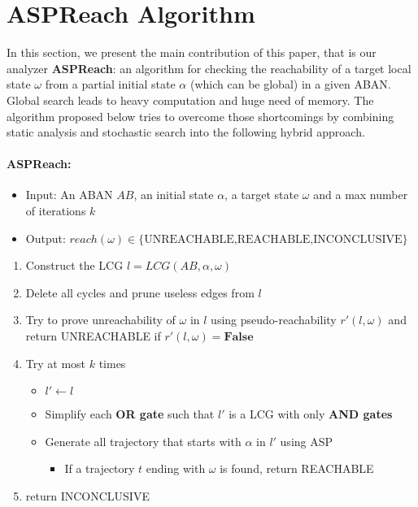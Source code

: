 \documentclass{entcs}
\begin{document}
\section{ASPReach Algorithm}
In this section, we present the main contribution of this paper, that is our analyzer \textbf{ASPReach}: an algorithm for checking the reachability of a target local state $\omega$ from a partial initial state $\alpha$ (which can be global) in a given ABAN.
Global search leads to heavy computation and huge need of memory.
The algorithm proposed below tries to overcome those shortcomings by combining static analysis and stochastic search into the following hybrid approach.


\paragraph{{\bf ASPReach}:}

\begin{itemize}
    \item Input: An ABAN $AB$, an initial state $\alpha$, a target state $\omega$ and a max number of iterations $k$
    \item Output: $reach(\omega)\in\{\text{UNREACHABLE,REACHABLE,INCONCLUSIVE}\}$
\end{itemize}
\begin{enumerate}
    \item Construct the LCG $l=LCG(AB,\alpha,\omega)$
    \item Delete all cycles and prune useless edges from $l$
    \item Try to prove unreachability of $\omega$ in $l$ using pseudo-reachability $r'(l,\omega)$ and return UNREACHABLE if $r'(l,\omega)=\textbf{False}$
    \item Try at most $k$ times
    \begin{itemize}
    \item $l'\gets l$
    \item Simplify each \textbf{OR gate} such that $l'$ is a LCG with only \textbf{AND gates}
    \item Generate all trajectory that starts with $\alpha$ in $l'$ using ASP
    \begin{itemize}
        \item If a trajectory $t$ ending with $\omega$ is found, return REACHABLE
    \end{itemize}
    \end{itemize}
    \item return INCONCLUSIVE
\end{enumerate}
\end{document}

